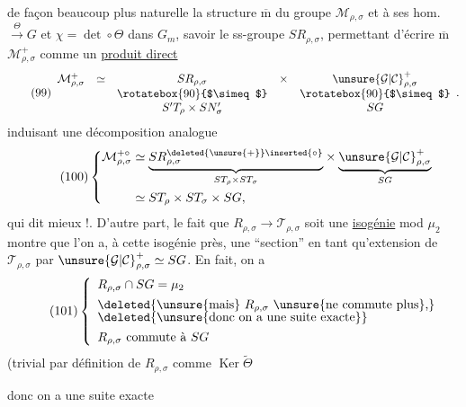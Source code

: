 
 de façon beaucoup plus naturelle  la structure
$\overline{\mathrm m}$ du groupe $\mathcal{M}_{\rho,\sigma}$ et à ses hom.
$\xrightarrow{\Theta}G$ et $\chi=\det\circ\Theta$ dans $G_m$, savoir le
ss-groupe  $SR_{\rho,\sigma}$, permettant d'écrire
$\overline{\mathrm m}$ $\mathcal{M}_{\rho,\sigma}^{+}$ comme un
\uline{produit direct}
\[
\tag{99}
\begin{array}{rccccc}
\mathcal{M}_{\rho,\sigma}^{+}&\simeq&SR_{\rho,\sigma}&\times&
 \unsure{\mathcal{G}|\mathcal{C}}_{\rho,\sigma}^{+}\\
&&\rotatebox{90}{$\simeq$}&&\rotatebox{90}{$\simeq$}\\
&&S'T_\rho\times SN'_\sigma&&SG
\end{array}
.
\]
induisant une décomposition analogue
\[
\tag{100}
\left\{
\begin{aligned}
\mathcal{M}_{\rho,\sigma}^{+\circ}
 &\simeq \underset{ST_\rho\times ST_\sigma}{\underbrace{
 SR_{\rho,\sigma}^{\deleted{\unsure{+}}\inserted{\circ}}}}
 \times
 \underset{SG}{\underbrace{\unsure{\mathcal{G}|\mathcal{C}}_{\rho,\sigma}^{+}}}\\
 &\simeq ST_\rho\times ST_\sigma\times SG,
\end{aligned}
\right.
\]
qui dit mieux !. D'autre part, le fait que
$R_{\rho,\sigma}\longrightarrow\mathcal{T}_{\rho,\sigma}$ soit une
\uline{isogénie} mod $\mu_2$ montre que l'on a, à cette isogénie près, une
``section'' 
en tant qu'extension de $\mathcal{T}_{\rho,\sigma}$ par
$\unsure{\mathcal{G}|\mathcal{C}}_{\rho,\sigma}^{+}\simeq SG$.
En fait, on a
\[
\tag{101}
\left\{
\begin{array}{l}
R_{\rho,\sigma}\cap SG=\mu_2\\[4pt]
\deleted{\text{\unsure{mais} }R_{\rho,\sigma}\text{ \unsure{ne commute plus},}}\\[-2pt]
\deleted{\text{\unsure{donc on a une suite exacte}}}\\[4pt]
R_{\rho,\sigma}\text{ commute à }SG
\end{array}
\right.
\]
\hfill (trivial par définition de $R_{\rho,\sigma}$ comme
$\operatorname{Ker}\widetilde{\Theta}$

donc on a une suite exacte



